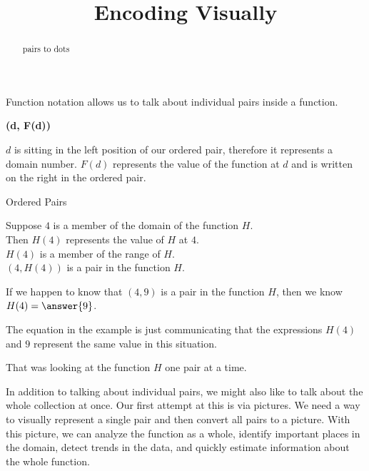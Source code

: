 \documentclass{ximera}
\title{Encoding Visually}
\begin{document}
\begin{abstract}
pairs to dots
\end{abstract}
\maketitle


Function notation allows us to talk about individual pairs inside a function.


\begin{center}
\textbf{\textcolor{purple!85!blue}{(d, F(d))}}
\end{center}




$d$ is sitting in the left position of our ordered pair, therefore it represents a domain number. $F(d)$ represents the value of the function at $d$ and is written on the right in the ordered pair.


\begin{example} Ordered Pairs

Suppose $4$ is a member of the domain of the function $H$. \\
Then $H(4)$ represents the value of $H$ at $4$. \\
$H(4)$ is a member of the range of $H$. \\
$(4, H(4))$ is a pair in the function $H$.

If we happen to know that $(4, 9)$ is a pair in the function $H$, then we know $H(4) = \answer{9}$.

\end{example}
The equation in the example is just communicating that the expressions $H(4)$ and $9$ represent the same value in this situation. 

That was looking at the function $H$ one pair at a time. 



In addition to talking about individual pairs, we might also like to talk about the whole collection at once.  Our first attempt at this is via pictures. We need a way to visually represent a single pair and then convert all pairs to a picture.  With this picture, we can analyze the function as a whole, identify important places in the domain, detect trends in the data, and quickly estimate information about the whole function.
\end{document}
